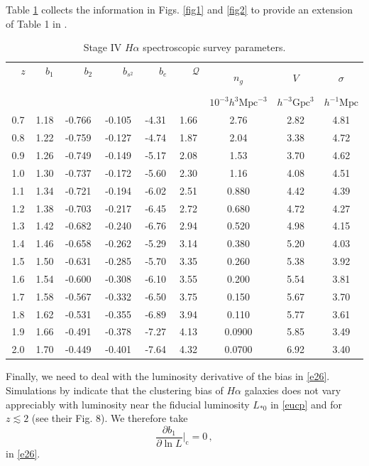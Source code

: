 Table \ref{tab1} collects the information in Figs. \ref{fig1} and \ref{fig2} to provide an extension of Table  1 in \cite{Yankelevich:2018uaz}.
\begin{table}[!ht] 
\centering 
\caption{Stage IV $H\alpha$ spectroscopic survey parameters.} \label{tab1} 
\vspace*{0.2cm}
\begin{tabular}{|c|c|c|c|c|c|c|c|c|} 
\hline 
~~$z$~~ & ~~$b_{1}$~~ & ~~~~$b_{2}$~~~~ & ~~~~$b_{s^{2}}$~~~~ & ~~~$b_{e}$~~~ & ~~~$\mathcal{Q}$~~~ & $n_{g}$ & $V$ & $\sigma$ \\ 
 & & & & & & $10^{-3}h^{3} \mathrm{Mpc}^{-3}$ & $h^{-3} \mathrm{Gpc}^{3}$ & $h^{-1} \mathrm{Mpc}$\\
\hline\hline 
0.7 & 1.18 & -0.766 & -0.105 & -4.31 & 1.66 & 2.76 & 2.82 & 4.81 \\
0.8 & 1.22 & -0.759 & -0.127 & -4.74 & 1.87 & 2.04 & 3.38 & 4.72 \\
0.9 & 1.26 & -0.749 & -0.149 & -5.17 & 2.08 & 1.53 & 3.70 & 4.62 \\
1.0 & 1.30 & -0.737 & -0.172 & -5.60 & 2.30 & 1.16 & 4.08 & 4.51 \\
1.1 & 1.34 & -0.721 & -0.194 & -6.02 & 2.51 & 0.880 & 4.42 & 4.39 \\
1.2 & 1.38 & -0.703 & -0.217 & -6.45 & 2.72 & 0.680 & 4.72 & 4.27 \\
1.3 & 1.42 & -0.682 & -0.240 & -6.76 & 2.94 & 0.520 & 4.98 & 4.15 \\
1.4 & 1.46 & -0.658 & -0.262 & -5.29 & 3.14 & 0.380 & 5.20 & 4.03 \\
1.5 & 1.50 & -0.631 & -0.285 & -5.70 & 3.35 & 0.260 & 5.38 & 3.92 \\
1.6 & 1.54 & -0.600 & -0.308 & -6.10 & 3.55 & 0.200 & 5.54 & 3.81 \\
1.7 & 1.58 & -0.567 & -0.332 & -6.50 & 3.75 & 0.150 & 5.67 & 3.70 \\
1.8 & 1.62 & -0.531 & -0.355 & -6.89 & 3.94 & 0.110 & 5.77 & 3.61 \\
1.9 & 1.66 & -0.491 & -0.378 & -7.27 & 4.13 & 0.0900 & 5.85 & 3.49 \\
2.0 & 1.70 & -0.449 & -0.401 & -7.64 & 4.32 & 0.0700 & 6.92 & 3.40 \\ \hline
\end{tabular}
\end{table}

Finally, we need to deal with the luminosity derivative of the bias in \eqref{e26}. Simulations by \cite{Pan:2019dxa} indicate that the  clustering bias of $H\alpha$ galaxies does not vary appreciably with luminosity near the fiducial luminosity $L_{*0}$ in \eqref{eucp} and for $z\lesssim 2$ (see their Fig. 8). We therefore take
\begin{equation}\label{b1l}
\frac{\partial b_1}{\partial \ln{L}}\bigg|_{\mathrm{c}}=0\,, 
\end{equation}
in \eqref{e26}. 
%
%
